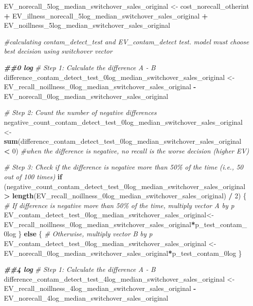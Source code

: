 \documentclass[
]{article}
\newenvironment{Shaded}{\begin{snugshade}}{\end{snugshade}}
\newcommand{\CommentTok}[1]{\textcolor[rgb]{0.56,0.35,0.01}{\textit{#1}}}
\newcommand{\ControlFlowTok}[1]{\textcolor[rgb]{0.13,0.29,0.53}{\textbf{#1}}}
\newcommand{\DecValTok}[1]{\textcolor[rgb]{0.00,0.00,0.81}{#1}}
\newcommand{\DocumentationTok}[1]{\textcolor[rgb]{0.56,0.35,0.01}{\textbf{\textit{#1}}}}
\newcommand{\FunctionTok}[1]{\textcolor[rgb]{0.13,0.29,0.53}{\textbf{#1}}}
\newcommand{\NormalTok}[1]{#1}
\newcommand{\OtherTok}[1]{\textcolor[rgb]{0.56,0.35,0.01}{#1}}
\newcommand{\SpecialCharTok}[1]{\textcolor[rgb]{0.81,0.36,0.00}{\textbf{#1}}}
\begin{document}
\begin{Shaded}
\begin{Highlighting}[]
\NormalTok{EV\_norecall\_5log\_median\_switchover\_sales\_original }\OtherTok{\textless{}{-}}\NormalTok{ cost\_norecall\_otherint }\SpecialCharTok{+}\NormalTok{ EV\_illness\_norecall\_5log\_median\_switchover\_sales\_original }\SpecialCharTok{+}\NormalTok{ EV\_noillness\_5log\_median\_switchover\_sales\_original}


\CommentTok{\#calculating contam\_detect\_test and EV\_contam\_detect test. model must choose best decision using switchover vector}

\DocumentationTok{\#\#0 log}
\CommentTok{\# Step 1: Calculate the difference A {-} B}
\NormalTok{difference\_contam\_detect\_test\_0log\_median\_switchover\_sales\_original }\OtherTok{\textless{}{-}}\NormalTok{ EV\_recall\_noillness\_0log\_median\_switchover\_sales\_original }\SpecialCharTok{{-}}\NormalTok{ EV\_norecall\_0log\_median\_switchover\_sales\_original}

\CommentTok{\# Step 2: Count the number of negative differences}
\NormalTok{negative\_count\_contam\_detect\_test\_0log\_median\_switchover\_sales\_original }\OtherTok{\textless{}{-}} \FunctionTok{sum}\NormalTok{(difference\_contam\_detect\_test\_0log\_median\_switchover\_sales\_original }\SpecialCharTok{\textless{}} \DecValTok{0}\NormalTok{) }\CommentTok{\#when the difference is negative, no recall is the worse decision (higher EV)}

\CommentTok{\# Step 3: Check if the difference is negative more than 50\% of the time (i.e., 50 out of 100 times)}
\ControlFlowTok{if}\NormalTok{ (negative\_count\_contam\_detect\_test\_0log\_median\_switchover\_sales\_original }\SpecialCharTok{\textgreater{}} \FunctionTok{length}\NormalTok{(EV\_recall\_noillness\_0log\_median\_switchover\_sales\_original) }\SpecialCharTok{/} \DecValTok{2}\NormalTok{) \{}
  \CommentTok{\# If difference is negative more than 50\% of the time, multiply vector A by p}
\NormalTok{  EV\_contam\_detect\_test\_0log\_median\_switchover\_sales\_original}\OtherTok{\textless{}{-}}\NormalTok{ EV\_recall\_noillness\_0log\_median\_switchover\_sales\_original}\SpecialCharTok{*}\NormalTok{p\_test\_contam\_0log}
\NormalTok{\} }\ControlFlowTok{else}\NormalTok{ \{}
  \CommentTok{\# Otherwise, multiply vector B by p}
\NormalTok{ EV\_contam\_detect\_test\_0log\_median\_switchover\_sales\_original  }\OtherTok{\textless{}{-}}\NormalTok{ EV\_norecall\_0log\_median\_switchover\_sales\_original}\SpecialCharTok{*}\NormalTok{p\_test\_contam\_0log}
\NormalTok{\}}


\DocumentationTok{\#\#4 log}
\CommentTok{\# Step 1: Calculate the difference A {-} B}
\NormalTok{difference\_contam\_detect\_test\_4log\_median\_switchover\_sales\_original }\OtherTok{\textless{}{-}}\NormalTok{ EV\_recall\_noillness\_4log\_median\_switchover\_sales\_original }\SpecialCharTok{{-}}\NormalTok{ EV\_norecall\_4log\_median\_switchover\_sales\_original}


\end{Highlighting}
\end{Shaded}
\end{document}
